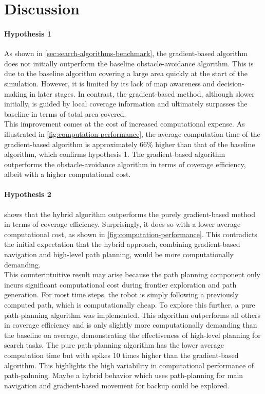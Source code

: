 \section{Discussion}
\paragraph{Hypothesis 1}
As shown in \cref{sec:search-algorithms-benchmark}, the gradient-based algorithm does not initially outperform the baseline obstacle-avoidance algorithm. This is due to the baseline algorithm covering a large area quickly at the start of the simulation. However, it is limited by its lack of map awareness and decision-making in later stages. In contrast, the gradient-based method, although slower initially, is guided by local coverage information and ultimately surpasses the baseline in terms of total area covered.\\

This improvement comes at the cost of increased computational expense. As illustrated in \cref{fig:computation-performance}, the average computation time of the gradient-based algorithm is approximately 66\% higher than that of the baseline algorithm, which confirms hypothesis 1. The gradient-based algorithm outperforms the obstacle-avoidance algorithm in terms of coverage efficiency, albeit with a higher computational cost.

\paragraph{Hypothesis 2}
 shows that the hybrid algorithm outperforms the purely gradient-based method in terms of coverage efficiency. Surprisingly, it does so with a lower average computational cost, as shown in \cref{fig:computation-performance}. This contradicts the initial expectation that the hybrid approach, combining gradient-based navigation and high-level path planning, would be more computationally demanding. \\

This counterintuitive result may arise because the path planning component only incurs significant computational cost during frontier exploration and path generation. For most time steps, the robot is simply following a previously computed path, which is computationally cheap. To explore this further, a pure path-planning algorithm was implemented. This algorithm outperforms all others in coverage efficiency and is only slightly more computationally demanding than the baseline on average, demonstrating the effectiveness of high-level planning for search tasks. The pure path-planning algorithm has the lower average computation time but with spikes 10 times higher than the gradient-based algorithm. This highlights the high variability in computational performance of path-palnning. Maybe a hybrid behavior which uses path-planning for main navigation and gradient-based movement for backup could be explored.

